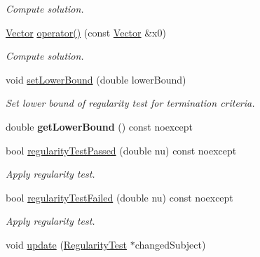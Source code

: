 \begin{DoxyCompactItemize}
\begin{DoxyCompactList}\small\item\em Compute solution. \end{DoxyCompactList}\item 
\hyperlink{classSpacy_1_1Vector}{Vector} \hyperlink{classSpacy_1_1CompositeStep_1_1AffineCovariantSolver_ae08612c2a1ca88d9a3746766bd5c1035}{operator()} (const \hyperlink{classSpacy_1_1Vector}{Vector} \&x0)
\begin{DoxyCompactList}\small\item\em Compute solution. \end{DoxyCompactList}\item 
void \hyperlink{classSpacy_1_1Mixin_1_1RegularityTest_a29ae1c15b8447601c2a783352e01bde2}{set\+Lower\+Bound} (double lower\+Bound)\hypertarget{classSpacy_1_1Mixin_1_1RegularityTest_a29ae1c15b8447601c2a783352e01bde2}{}\label{classSpacy_1_1Mixin_1_1RegularityTest_a29ae1c15b8447601c2a783352e01bde2}

\begin{DoxyCompactList}\small\item\em Set lower bound of regularity test for termination criteria. \end{DoxyCompactList}\item 
double {\bfseries get\+Lower\+Bound} () const noexcept\hypertarget{classSpacy_1_1Mixin_1_1RegularityTest_abc194f9b2150b6f02622867f673df4df}{}\label{classSpacy_1_1Mixin_1_1RegularityTest_abc194f9b2150b6f02622867f673df4df}

\item 
bool \hyperlink{classSpacy_1_1Mixin_1_1RegularityTest_a606383e629ebc0e84dc1cb6796aeeae1}{regularity\+Test\+Passed} (double nu) const noexcept
\begin{DoxyCompactList}\small\item\em Apply regularity test. \end{DoxyCompactList}\item 
bool \hyperlink{classSpacy_1_1Mixin_1_1RegularityTest_ac16e5fb18f3b591da58e32b821345f3d}{regularity\+Test\+Failed} (double nu) const noexcept
\begin{DoxyCompactList}\small\item\em Apply regularity test. \end{DoxyCompactList}\item 
void \hyperlink{classSpacy_1_1Mixin_1_1RegularityTest_a1a6191e20f84025cec8b10ec63ab94ac}{update} (\hyperlink{classSpacy_1_1Mixin_1_1RegularityTest_a89c4ffe9b8891c1f81d57e84141a2ef6}{Regularity\+Test} $\ast$changed\+Subject)\hypertarget{classSpacy_1_1Mixin_1_1RegularityTest_a1a6191e20f84025cec8b10ec63ab94ac}{}\label{classSpacy_1_1Mixin_1_1RegularityTest_a1a6191e20f84025cec8b10ec63ab94ac}


\end{DoxyCompactItemize}
